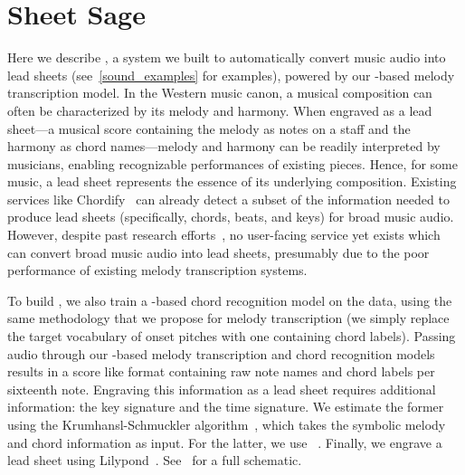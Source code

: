 \section{Sheet Sage}
\label{sec:sheetsage}

Here we describe \sheetsage, a system we built to automatically convert music audio into lead sheets (see~\cref{sound_examples} for examples), powered by our \jukebox-based melody transcription model. 
In the Western music canon, a musical composition can often be characterized by its melody and harmony. 
When engraved as a lead sheet---a musical score containing the melody as notes on a staff and the harmony as chord names---melody and harmony can be readily interpreted by musicians, enabling recognizable performances of existing pieces. 
Hence, for some music, a lead sheet represents the essence of its underlying composition.
Existing services like Chordify~\cite{de2014chordify} can already detect a subset of the information needed to produce lead sheets (specifically, chords, beats, and keys) for broad music audio. 
However, despite past research efforts~\cite{ryynanen2008automatic,weil2009automatic}, no user-facing service yet exists which can convert broad music audio into lead sheets, presumably due to the poor performance of existing melody transcription systems.

To build \sheetsage, we also train a \jukebox-based chord recognition model on the \hooktheory{} data, using the same methodology that we propose for melody transcription (we simply replace the target vocabulary of onset pitches with one containing chord labels). 
Passing audio through our \jukebox{}-based melody transcription and chord recognition models results in a score like format containing raw note names and chord labels per sixteenth note. 
Engraving this information as a lead sheet requires additional information: the key signature and the time signature. 
We estimate the former using the Krumhansl-Schmuckler algorithm~\cite{krumhansl1990cognitive,temperley1999key}, which takes the symbolic melody and chord information as input. 
For the latter, we use \madmom~\cite{bock2016madmom,bock2016joint}. 
Finally, we engrave a lead sheet using Lilypond~\cite{nienhuys2003lilypond}. 
See~ for a full schematic.

